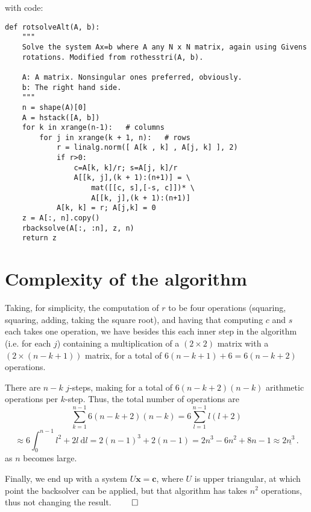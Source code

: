 \documentclass[11pt]{amsart}
\theoremstyle{definition}
\numberwithin{equation}{section}
\begin{document}
with code:
\begin{lstlisting}
def rotsolveAlt(A, b):
    """
    Solve the system Ax=b where A any N x N matrix, again using Givens
    rotations. Modified from rothesstri(A, b).
    
    A: A matrix. Nonsingular ones preferred, obviously.
    b: The right hand side.
    """
    n = shape(A)[0]
    A = hstack([A, b])
    for k in xrange(n-1):   # columns
        for j in xrange(k + 1, n):   # rows
            r = linalg.norm([ A[k , k] , A[j, k] ], 2)
            if r>0:
                c=A[k, k]/r; s=A[j, k]/r
                A[[k, j],(k + 1):(n+1)] = \
                    mat([[c, s],[-s, c]])* \
                    A[[k, j],(k + 1):(n+1)]
            A[k, k] = r; A[j,k] = 0
    z = A[:, n].copy()
    rbacksolve(A[:, :n], z, n)
    return z
\end{lstlisting}
\section{Complexity of the algorithm}
Taking, for simplicity, the computation of $r$ to be four operations (squaring, squaring, adding, taking the square root), and having that computing $c$ and $s$ each takes one operation, we  have besides this each inner step in the algorithm (i.e. for each $j$) containing a multiplication of a $(2\times 2)$ matrix with a $(2 \times (n - k + 1))$ matrix, for a total of $6(n-k + 1) + 6 = 6(n - k + 2)$ operations. 

There are $n-k$ $j$-steps, making for a total of $6(n-k + 2)(n-k)$ arithmetic operations per $k$-step. Thus, the total number of operations are
\newcommand{\dk}{\:\mbox{d}k}
\newcommand{\dl}{\:\mbox{d}l}
\begin{equation}
\sum_{k = 1}^{n-1}
6(n - k + 2)(n-k)
=
6
\sum_{l = 1}^{n-1}l(l+2)
\end{equation}
\begin{equation}
\approx 6\int_0^{n-1} l^2 + 2l \dl = 
2(n-1)^3 + 2(n-1) = 2n^3 - 6n^2 + 8n - 1 \approx \underline{2n^3\,.}
\end{equation}
as $n$ becomes large.

Finally, we end up with a system $U\mathbf{x} = \mathbf{c}$, where $U$ is upper triangular, at which point the backsolver can be applied, but that algorithm has takes $n^2$ operations, thus not changing the result.
$\qed$
\end{document}
